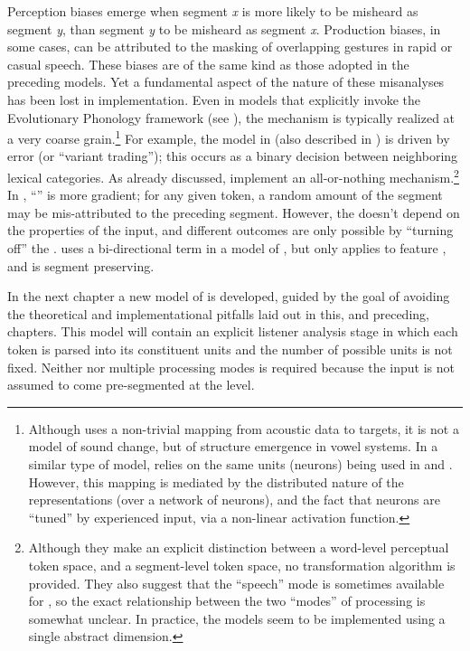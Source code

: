 Perception biases emerge when segment \emph{x} is more likely to be
misheard as segment \emph{y}, than segment \emph{y} to be misheard
as segment \emph{x}. Production biases, in some cases, can be attributed
to the masking of overlapping  gestures in rapid or casual
speech. These biases are of the same kind as those adopted in the
preceding models. Yet a fundamental aspect of the nature of these
misanalyses has been lost in implementation. Even in models that explicitly
invoke the Evolutionary Phonology framework (see \citealt{Blevins2004}),
the mechanism is typically realized at a very coarse grain.\footnote{Although \citet{Boer2000} uses a non-trivial mapping from acoustic
data to  targets, it is not a model of sound change, but
of structure emergence in vowel systems. In a similar type of model,
\citet{oudeyer2006self} relies on the same units (neurons) being
used in  and . However, this mapping is mediated
by the distributed nature of the representations (over a network of
neurons), and the fact that neurons are ``tuned'' by experienced input,
via a non-linear activation function. } For example, the model in \citet{wedel2017category} (also described
in \citealt{Blevins2009}) is driven by  error (or “variant
trading”); this occurs as a binary decision between neighboring
lexical categories. As already discussed, \citet{Garrett2013} implement
an all-or-nothing  mechanism.\footnote{Although they make an explicit distinction between a word-level perceptual
token space, and a segment-level  token space, no transformation
algorithm is provided. They also suggest that the  ``speech''
mode is sometimes available for , so the exact relationship
between the two ``modes'' of processing is somewhat unclear. In practice,
the models seem to be implemented using a single abstract 
dimension.} In \citet{Kirby2014}, ``'' is more gradient; for any given
token, a random amount of the  segment may be mis-attributed
to the preceding segment. However, the  doesn't depend on
the  properties of the input, and different outcomes are only
possible by ``turning off'' the . \citet{morley2014implications}
uses a bi-directional  term in a model of ,
but  only applies to feature , and is segment
preserving. 

In the next chapter a new model of  is developed,\largerpage
guided by the goal of avoiding the theoretical and implementational
pitfalls laid out in this, and preceding, chapters. This model will
contain an explicit listener analysis stage in which each token is parsed into its 
constituent units and the number of possible units is not fixed. Neither  
nor multiple processing modes is required because the input is not assumed to come pre-segmented 
at the  level. 
